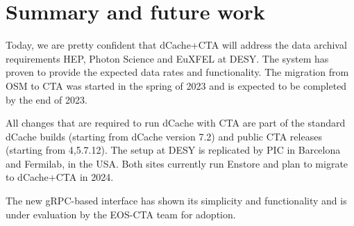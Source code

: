 \documentclass{webofc}
\begin{document}
\section{Summary and future work}
\label{summary}

Today, we are pretty confident that dCache+CTA will address the data archival requirements HEP, Photon Science and EuXFEL at DESY. The system has proven to provide the expected data rates and functionality. The migration from OSM to CTA was started in the spring of 2023 and is expected to be completed by the end of 2023.

All changes that are required to run dCache with CTA are part of the standard dCache builds (starting from dCache version 7.2) and public CTA releases (starting from {4,5}.7.12). The setup at DESY is replicated by PIC in Barcelona and Fermilab, in the USA. Both sites currently run Enstore\cite{enstore} and plan to migrate to dCache+CTA in 2024.
 
The new gRPC-based interface has shown its simplicity and functionality and is under evaluation by the EOS-CTA team for adoption.


\end{document}
